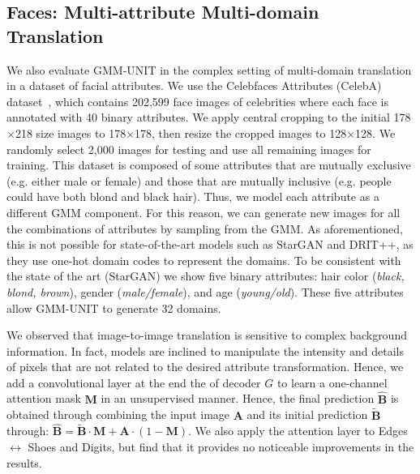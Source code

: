 \documentclass[runningheads]{llncs}
\begin{document}
\subsection{Faces: Multi-attribute Multi-domain Translation}
We also evaluate GMM-UNIT in the complex setting of multi-domain translation in a dataset of facial attributes.
We use the Celebfaces Attributes (CelebA) dataset~\cite{liu2015deep}, which contains 202,599 face images of celebrities where each face is annotated with 40 binary attributes. We apply central cropping to the initial 178$\times$218 size
images to 178$\times$178, then resize the cropped images to 128$\times$128. We randomly select 2,000 images for testing and use all remaining images for training. 
This dataset is composed of some attributes that are mutually exclusive (e.g. either male or female) and those that are mutually inclusive (e.g. people could have both blond and black hair).
Thus, we model each attribute as a different GMM component. For this reason, we can generate new images for all the combinations of attributes by sampling from the GMM. 
As aforementioned, this is not possible for state-of-the-art models such as StarGAN and DRIT++, as they use one-hot domain codes to represent the domains. 
To be consistent with the state of the art (StarGAN) we show five binary attributes: hair color (\textit{black, blond, brown}),
gender (\textit{male/female}), and age (\textit{young/old}). These five attributes allow GMM-UNIT to generate 32 domains.

We observed that image-to-image translation is sensitive to complex background information. In fact, models are inclined to manipulate the intensity and details of pixels that are not related to the desired attribute transformation. 
Hence, we add a convolutional layer at the end the of decoder $G$ to learn a one-channel attention mask $\mathbf{M}$ in an unsupervised manner. Hence, the final prediction $\widehat{\mathbf{B}}$ is obtained through combining the input image $\mathbf{A}$ and its initial prediction $\widetilde{\mathbf{B}}$ through: $\widehat{\mathbf{B}} = \widetilde{\mathbf{B}} \cdot \mathbf{M} + \mathbf{A} \cdot (1-\mathbf{M}) $.
We also apply the attention layer to Edges $\leftrightarrow$ Shoes and Digits, but find that it provides no noticeable improvements in the results. 
\end{document}
